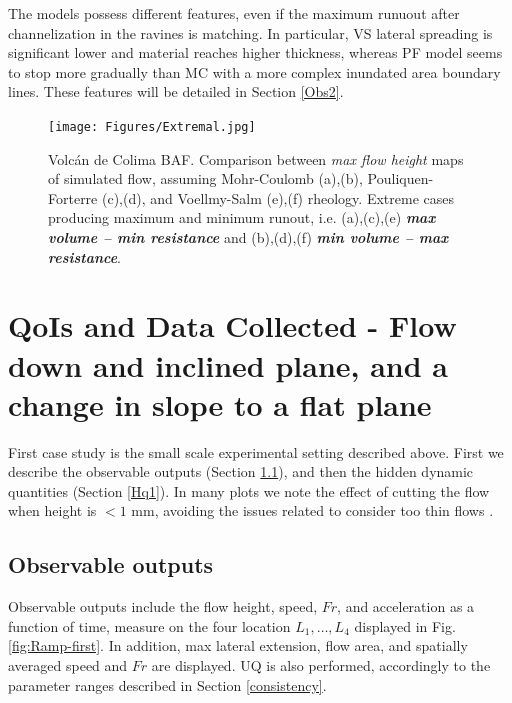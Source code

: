 \documentclass{article}
\begin{document}
The models possess different features, even if the maximum runuout after channelization in the ravines is matching. In particular, VS lateral spreading is significant lower and material reaches higher thickness, whereas PF model seems to stop more gradually than MC with a more complex inundated area boundary lines. These features will be detailed in Section \ref{Obs2}.

\begin{figure}[H]
         \centering
        \texttt{[image: Figures/Extremal.jpg]}
        \caption{Volc\'an de Colima BAF. Comparison between \emph{max flow height} maps of simulated flow, assuming Mohr-Coulomb (a),(b), Pouliquen-Forterre (c),(d), and Voellmy-Salm (e),(f) rheology. Extreme cases producing maximum and minimum runout, i.e. (a),(c),(e) \emph{\textbf{max volume -- min resistance}} and (b),(d),(f) \emph{\textbf{min volume -- max resistance}}.}
        \label{Colima-MaxMinExtents}
\end{figure}

\section{QoIs and Data Collected - Flow down and inclined plane, and a change in slope to a flat plane}\label{sec:QoIs}
First case study is the small scale experimental setting described above. First we describe the observable outputs (Section \ref{Obs1}), and then the hidden dynamic quantities (Section \ref{Hq1}). In many plots we note the effect of cutting the flow when height is $<1$ mm, avoiding the issues related to consider too thin flows \citep{Aghakhani2016}.

\subsection{Observable outputs} \label{Obs1}
Observable outputs include the flow height, speed, $Fr$, and acceleration as a function of time, measure on the four location $L_1,\dots, L_4$ displayed in Fig. \ref{fig:Ramp-first}. In addition, max lateral extension, flow area, and spatially averaged speed and $Fr$ are displayed. UQ is also performed, accordingly to the parameter ranges described in Section \ref{consistency}.
\end{document}
